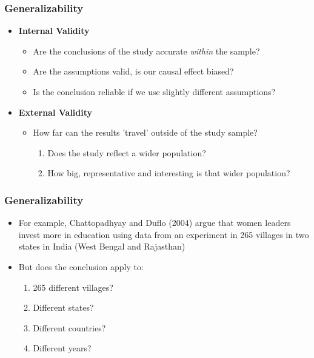 \documentclass[xcolor=x11names,compress]{beamer}\usepackage[]{graphicx}\usepackage[]{color}
\renewcommand{\(}{\begin{columns}}
\renewcommand{\)}{\end{columns}}
\newcommand{\<}[1]{\begin{column}{#1}}
\renewcommand{\>}{\end{column}}
\begin{document}
\begin{frame}
\frametitle{Generalizability}
\begin{itemize}
\item \textbf{Internal Validity}
\begin{itemize}
\item Are the conclusions of the study accurate \textit{within} the sample?
\pause
\item Are the assumptions valid, is our causal effect biased?
\pause
\item Is the conclusion reliable if we use slightly different assumptions?
\pause
\end{itemize}
\item \textbf{External Validity}
\begin{itemize}
\item How far can the results 'travel' outside of the study sample?
\pause
\begin{enumerate}
\item Does the study reflect a wider population?
\pause
\item How big, representative and interesting is that wider population?
\end{enumerate}
\end{itemize}
\end{itemize}
\end{frame}

\begin{frame}
\frametitle{Generalizability}
\begin{itemize}
\item For example, Chattopadhyay and Duflo (2004) argue that women leaders invest more in education using data from an experiment in 265 villages in two states in India (West Bengal and Rajasthan)
\pause
\item But does the conclusion apply to:
\pause
\begin{enumerate}
\item 265 different villages?
\pause
\item Different states?
\pause
\item Different countries?
\pause
\item Different years?
\end{enumerate}
\end{itemize}
\end{frame}
\end{document}

